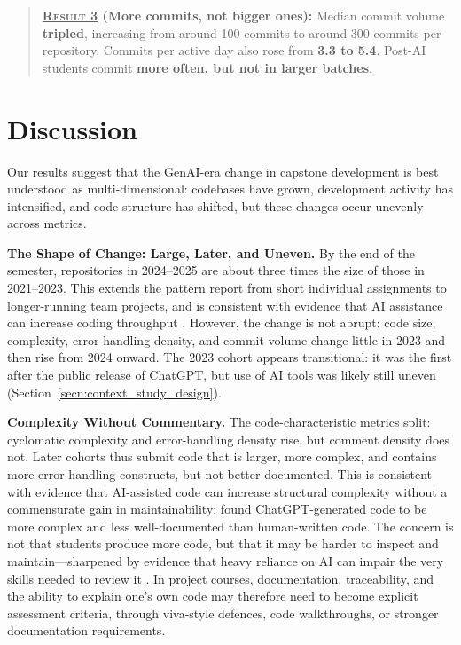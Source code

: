 \documentclass[sigconf,authorversion]{acmart}
\newcommand{\todo}[1]{#1}
\begin{document}
\begin{quote}
\textbf{\textsc{\underline{Result 3}} (More commits, not bigger ones):}
Median commit volume \textbf{tripled}, increasing from around 100 commits to around 300 commits per repository. Commits per active day also rose from \textbf{3.3 to 5.4}. Post-AI students commit \textbf{more often, but not in larger batches}.
\end{quote}

\section{Discussion}
\label{sec:discussion}

Our results suggest that the GenAI-era change in capstone development is best understood as multi-dimensional: codebases have grown, development activity has intensified, and code structure has shifted, but these changes occur unevenly across metrics.

\textbf{The Shape of Change: Large, \todo{Later}, and Uneven.}
By the end of the semester, \todo{repositories in 2024--2025 are about three times the size of those in 2021--2023}. This extends the pattern \citet{zhang2026changes} report from short individual assignments to longer-running team projects, and is consistent with evidence that AI assistance can increase coding throughput \citep{peng2023impact}. However, the change is not abrupt: code size, complexity, error-handling density, and commit volume change little in 2023 and then rise from 2024 onward. 
The 2023 cohort appears transitional: it was the first after the public release of ChatGPT, but use of AI tools was likely still uneven (Section~\ref{secn:context_study_design}).

\textbf{Complexity Without Commentary.}
The code-characteristic metrics split: cyclomatic complexity and error-handling density rise, but comment density does not. Later cohorts thus submit code that is larger, more complex, and contains more error-handling constructs, but not better documented. This is consistent with evidence that AI-assisted code can increase structural complexity without a commensurate gain in maintainability: \citet{azeem2025ai} found ChatGPT-generated code to be more complex and less well-documented than human-written code. The concern is not that students produce more code, but that it may be harder to inspect and maintain---sharpened by evidence that heavy reliance on AI can impair the very skills needed to review it \citep{shen2026ai}. In project courses, documentation, traceability, and the ability to explain one's own code may therefore need to become explicit assessment criteria, through viva-style defences, code walkthroughs, or stronger documentation requirements.
\end{document}
